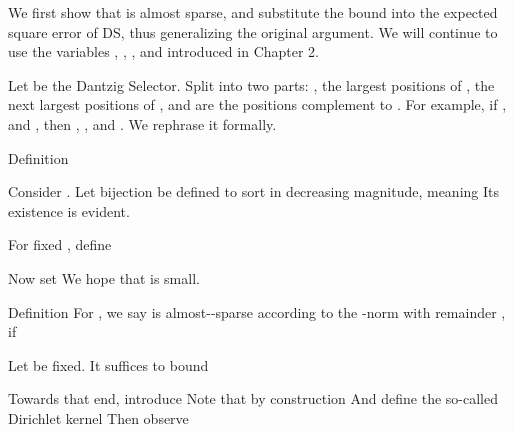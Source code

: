 \startsection [title={Almost-Sparsity of Angular Channel Response}]
\startsubsection [title={Norm of Array Response}]

We first show that  is almost sparse, and substitute the bound into the expected square error of DS, thus generalizing the original argument.
We will continue to use the variables , , , and  introduced in Chapter 2.

Let  be the Dantzig Selector.
Split  into two parts: , the largest  positions of ,  the next  largest positions of , and  are the positions complement to .
For example, if , and , then , , and .
We rephrase it formally.

\Result
{Definition}
{
Consider .
Let bijection  be defined to sort  in decreasing magnitude, meaning
Its existence is evident.

For fixed , define
}


Now set
We hope that  is small.

\Result
{Definition}
{
For , we say  is almost--sparse according to the -norm with remainder , if
}

Let \m {\f} be fixed.
It suffices to bound

Towards that end, introduce
Note that by construction
And define the so-called Dirichlet kernel
Then observe

